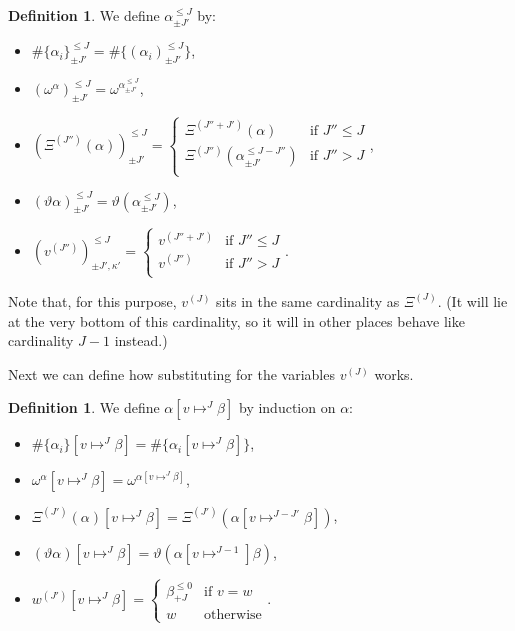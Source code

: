 \documentclass[11pt]{amsart}
\theoremstyle{definition}
\newtheorem{definition}[theorem]{Definition}
\begin{document}
\begin{definition}
  We define $\alpha^{\leq J}_{\pm J'}$ by:
  \begin{itemize}
  \item $\#\{\alpha_i\}^{\leq J}_{\pm J'}=\#\{(\alpha_i) ^{\leq J}_{\pm J'}\}$,
  \item $(\omega^\alpha) ^{\leq J}_{\pm J'}=\omega^{\alpha^{\leq J}_{\pm J'}}$,
  \item $(\Xi^{(J'')}(\alpha))^{\leq J}_{\pm J'}=    \left\{\begin{array}{ll}
             \Xi^{(J''+J')}(\alpha)&\text{if }J''\leq J\\
             \Xi^{(J'')}(\alpha^{\leq J-J''}_{\pm J'})&\text{if }J''>J\\
           \end{array}\right.$,
  \item $(\vartheta\alpha)^{\leq J}_{\pm J'}=\vartheta(\alpha^{\leq J}_{\pm J'})$,
  \item $(v^{(J'')})^{\leq J}_{\pm J',\kappa'}=    \left\{\begin{array}{ll}
             v^{(J''+J')}&\text{if }J''\leq J\\
             v^{(J'')}&\text{if }J''> J\\
           \end{array}\right.$.
  \end{itemize}
\end{definition}

Note that, for this purpose, $v^{(J)}$ sits in the same cardinality as $\Xi^{(J)}$. (It will lie at the very bottom of this cardinality, so it will in other places behave like cardinality $J-1$ instead.)

Next we can define how substituting for the variables $v^{(J)}$ works.
\begin{definition}
  We define $\alpha[v\mapsto^{J}\beta]$ by induction on $\alpha$:
  \begin{itemize}
  \item $\#\{\alpha_i\}[v\mapsto^{J}\beta]=\#\{\alpha_i[v\mapsto^{J}\beta]\}$,
  \item $\omega^\alpha[v\mapsto^{J}\beta]=\omega^{\alpha[v\mapsto^{J}\beta]}$,
  \item $\Xi^{(J')}(\alpha)[v\mapsto^{J}\beta]=\Xi^{(J')}(\alpha[v\mapsto^{J-J'}\beta])$,
       \item $(\vartheta\alpha)[v\mapsto^{J}\beta]=\vartheta(\alpha[v\mapsto^{J-1}]\beta)$,
  \item $w^{(J')}[v\mapsto^{J}\beta]=\left\{\begin{array}{ll}
                                                      \beta^{\leq 0}_{+J}&\text{if }v=w\\
                                                      w&\text{otherwise}
                                                    \end{array}\right.$.
  \end{itemize}

\end{definition}
\end{document}
